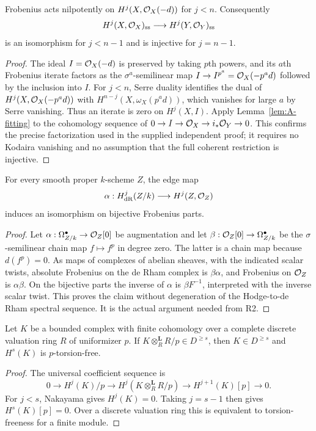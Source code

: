 \begin{lemma}\label{lem:A-R1}
 Frobenius acts nilpotently on
$H^j(X,\mathcal O_X(-d))$ for $j<n$.  Consequently
\[
 H^j(X,\mathcal O_X)_{\mathrm{ss}}\longrightarrow H^j(Y,\mathcal O_Y)_{\mathrm{ss}}
\]
is an isomorphism for $j<n-1$ and is injective for $j=n-1$.
\end{lemma}
\begin{proof}
The ideal $I=\mathcal O_X(-d)$ is preserved by taking $p$th powers, and its
$a$th Frobenius iterate factors as the $\sigma^a$-semilinear map
$I\to I^{p^a}=\mathcal O_X(-p^ad)$ followed by the inclusion into $I$.
For $j<n$, Serre duality identifies the dual of
$H^j(X,\mathcal O_X(-p^ad))$ with
$H^{n-j}(X,\omega_X(p^ad))$, which vanishes for large $a$ by Serre
vanishing.  Thus an iterate is zero on $H^j(X,I)$.  Apply
Lemma~\ref{lem:A-fitting} to the cohomology sequence of
$0\to I\to\mathcal O_X\to i_*\mathcal O_Y\to0$.
This confirms the precise factorization used in the supplied independent
proof; it requires no Kodaira vanishing and no assumption that the full
coherent restriction is injective.
\end{proof}

\begin{lemma}[Recheck of R2]\label{lem:A-R2}
 For every smooth proper $k$-scheme $Z$, the edge map
\[
 \alpha:H^j_{\mathrm{dR}}(Z/k)\longrightarrow H^j(Z,\mathcal O_Z)
\]
induces an isomorphism on bijective Frobenius parts.
\end{lemma}
\begin{proof}
Let $\alpha:\Omega^\bullet_{Z/k}\to\mathcal O_Z[0]$ be augmentation and
let $\beta:\mathcal O_Z[0]\to\Omega^\bullet_{Z/k}$ be the
$\sigma$-semilinear chain map $f\mapsto f^p$ in degree zero.
The latter is a chain map because $d(f^p)=0$.  As maps of complexes of
abelian sheaves, with the indicated scalar twists, absolute Frobenius
on the de Rham complex is $\beta\alpha$, and Frobenius on $\mathcal O_Z$ is
$\alpha\beta$.  On the bijective parts the inverse of $\alpha$ is
$\beta F^{-1}$, interpreted with the inverse scalar twist.  This proves
the claim without degeneration of the Hodge-to-de Rham spectral
sequence.  It is the actual argument needed from R2.
\end{proof}

\begin{lemma}\label{lem:A-derived-Nakayama}
 Let $K$ be a bounded complex with finite cohomology
over a complete discrete valuation ring $R$ of uniformizer $p$.
If $K\otimes_R^{\mathbf L}R/p\in D^{\geq s}$, then
$K\in D^{\geq s}$ and $H^s(K)$ is $p$-torsion-free.
\end{lemma}
\begin{proof}
The universal coefficient sequence is
\[
0\to H^j(K)/p\to H^j(K\otimes_R^{\mathbf L}R/p)
  \to H^{j+1}(K)[p]\to0.
\]
For $j<s$, Nakayama gives $H^j(K)=0$.  Taking $j=s-1$ then gives
$H^s(K)[p]=0$.  Over a discrete valuation ring this is equivalent to
torsion-freeness for a finite module.
\end{proof}

